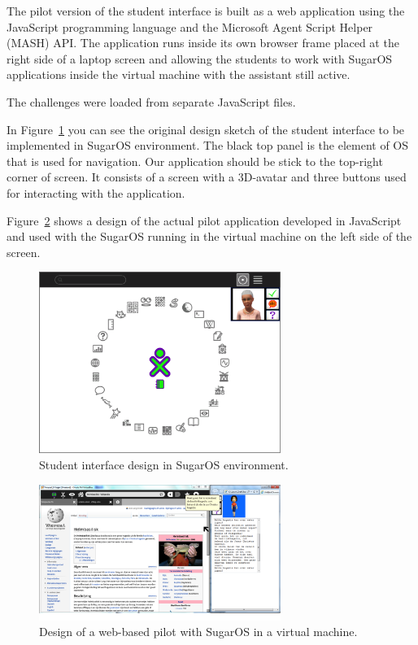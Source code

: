 \documentclass[a4paper]{article}
\begin{document}
The pilot version of the student interface is built as a web application using the JavaScript programming language and the Microsoft Agent Script Helper (MASH) API. The application runs inside its own browser frame placed at the right side of a laptop screen and allowing the students to work with SugarOS applications inside the virtual machine with the assistant still active.

The challenges were loaded from separate JavaScript files.

In Figure~\ref{fig:intended-design} you can see the original design sketch of the student interface to be implemented in SugarOS environment. The black top panel is the element of OS that is used for navigation. Our application should be stick to the top-right corner of screen. It consists of a screen with a 3D-avatar and three buttons used for interacting with the application. 

Figure~\ref{fig:pilot-design} shows a design of the actual pilot application developed in JavaScript and used with the SugarOS running in the virtual machine on the left side of the screen. 

\begin{figure}[ht]
\begin{center}
\includegraphics[width=0.7\textwidth]{intended-design.png}
\caption{Student interface design in SugarOS environment.}
\label{fig:intended-design}
\end{center}
\end{figure}

\begin{figure}[ht]
\begin{center}
\includegraphics[width=0.7\textwidth]{pilot-design.png}
\caption{Design of a web-based pilot with SugarOS in a virtual machine.}
\label{fig:pilot-design}
\end{center}
\end{figure}
\end{document}
